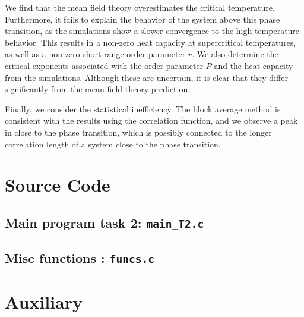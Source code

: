 We find that the mean field theory overestimates the critical temperature. Furthermore, it fails to explain the behavior of the system above this phase transition, as the simulations show a slower convergence to the high-temperature behavior. This results in a non-zero heat capacity at supercritical temperatures, as well as a non-zero short range order parameter $r$. We also determine the critical exponents associated with the order parameter $P$ and the heat capacity from the simulations. Although these are uncertain, it is clear that they differ significantly from the mean field theory prediction. 


Finally, we consider the statistical inefficiency. The block average method is consistent with the results using the correlation function, and we observe a peak in close to the phase transition, which is possibly connected to the longer correlation length of a system close to the phase transition. 

\newpage

\appendix

\section{Source Code}

%

%

\subsection{Main program task 2: \texttt{main\_T2.c}}



\subsection{Misc functions : \texttt{funcs.c}}


\section{Auxiliary }
